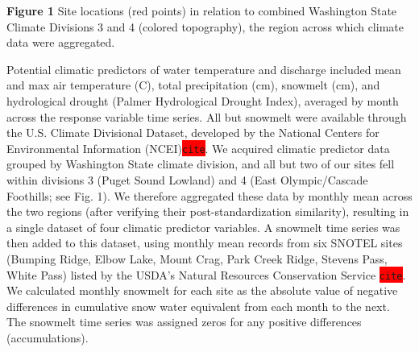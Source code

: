 \documentclass[notitlepage]{article}
\begin{document}
\begin{center}
\textbf{Figure 1} Site locations (red points) in relation to combined Washington State Climate Divisions 3 and 4 (colored topography), the region across which climate data were aggregated.
\end{center}

Potential climatic predictors of water temperature and discharge included mean and max air temperature (\degree C), total precipitation (cm), snowmelt (cm), and hydrological drought (Palmer Hydrological Drought Index), averaged by month across the response variable time series. All but snowmelt were available through the U.S. Climate Divisional Dataset, developed by the National Centers for Environmental Information (NCEI)\colorbox{red}{\lstinline{cite}}. We acquired climatic predictor data grouped by Washington State climate division, and all but two of our sites fell within divisions 3 (Puget Sound Lowland) and 4 (East Olympic/Cascade Foothills; see Fig. 1). We therefore aggregated these data by monthly mean across the two regions (after verifying their post-standardization similarity), resulting in a single dataset of four climatic predictor variables. A snowmelt time series was then added to this dataset, using monthly mean records from six SNOTEL sites (Bumping Ridge, Elbow Lake, Mount Crag, Park Creek Ridge, Stevens Pass, White Pass) listed by the USDA's Natural Resources Conservation Service \colorbox{red}{\lstinline{cite}}. We calculated monthly snowmelt for each site as the absolute value of negative differences in cumulative snow water equivalent from each month to the next. The snowmelt time series was assigned zeros for any positive differences (accumulations).
\end{document}
